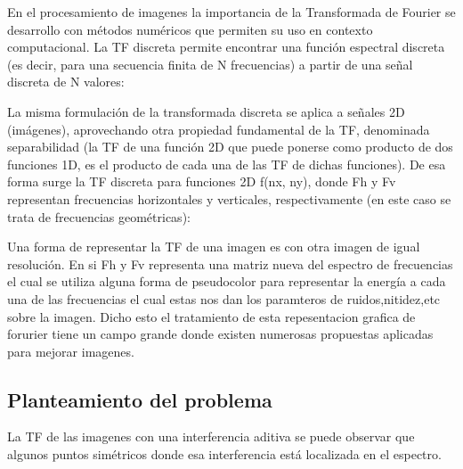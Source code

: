 \documentclass[Spanish,12pt,doublespace,german,letterpaper]{article}
\begin{document}
\tableofcontents
{}
\newpage

En el  procesamiento de imagenes la importancia de la Transformada de Fourier  se desarrollo con  métodos numéricos que permiten su uso en contexto computacional. 
La TF discreta permite encontrar una función espectral discreta (es decir, para una secuencia finita de N frecuencias) a partir de una señal discreta de N valores:


La misma formulación de la transformada discreta se aplica a señales 2D (imágenes), aprovechando otra propiedad fundamental de la TF, denominada separabilidad (la TF de una función 2D que puede ponerse como producto de dos funciones 1D, es el producto de cada una de las TF de dichas funciones).
De esa forma surge la TF discreta para funciones 2D f(nx, ny), donde Fh y Fv representan frecuencias horizontales y verticales, respectivamente (en este caso se trata de frecuencias geométricas):

 

Una forma de representar la TF de una imagen es con otra imagen de igual resolución. 
En si Fh y Fv representa una matriz nueva del espectro de frecuencias el cual se  utiliza  alguna forma de pseudocolor para representar la energía a cada una de las frecuencias el cual estas nos dan los paramteros de ruidos,nitidez,etc sobre la imagen.
Dicho esto el tratamiento de esta repesentacion grafica de forurier  tiene un campo grande donde existen numerosas propuestas aplicadas para mejorar imagenes. 



\subsection{Planteamiento del problema}
La TF de las imagenes con una interferencia aditiva se puede observar que  algunos  puntos simétricos donde esa interferencia está localizada en el espectro. 
\end{document}
